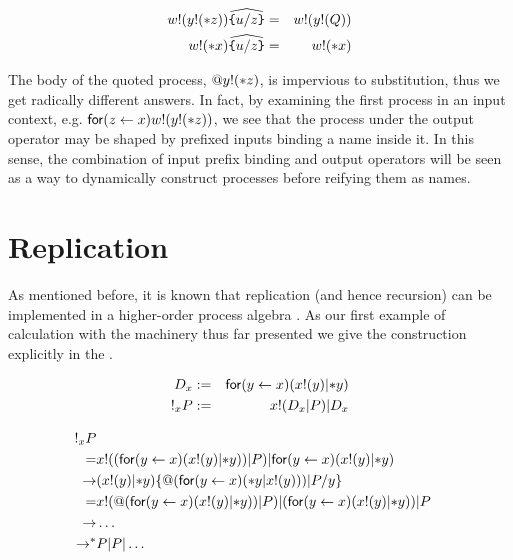 \begin{eqnarray}
	\lift{w}{\lift{y}{\dropn{z}}}\widehat{\id{\{}u / z \id{\}}}
		& = &
		\lift{w}{\lift{y}{Q}} \nonumber\\
	\lift{w}{\dropn{x}} \widehat{ \id{\{}u / z \id{\}} }
		& = &
		\lift{w}{\dropn{x}} \nonumber
\end{eqnarray}

The body of the quoted process, $\quotep{\lift{y}{\dropn{z}}}$, is
impervious to substitution, thus we get radically different
answers. In fact, by examining the first process in an input context,
e.g. $\mathsf{for}(z \leftarrow x)\lift{w}{\lift{y}{\dropn{z}}}$, we see that the process
under the output operator may be shaped by prefixed inputs binding a
name inside it. In this sense, the combination of input prefix binding
and output operators will be seen as a way to dynamically construct
processes before reifying them as names.

\section{Replication}

As mentioned before, it is known that replication (and hence
recursion) can be implemented in a higher-order process algebra
\cite{DBLP:books/daglib/0004377}. As our first example of calculation with the
machinery thus far presented we give the construction explicitly in
the {\rhoc}.

\begin{eqnarray}
	D_{x} & := & \prefix{x}{y}{(\binpar{\outputp{x}{y}}{\dropn{y}})} \nonumber\\
	\bangp_{x}{P} & := & \binpar{\lift{x}{\binpar{D_{x}}{P}}}{D_{x}} \nonumber
\end{eqnarray}

\begin{eqnarray}
	\bangp_{x}{P} & & \nonumber\\
	=
	& \lift{x}{(\prefix{x}{y}{(\outputp{x}{y} | \dropn{y})) | P}} 
	      | \prefix{x}{y}{(\outputp{x}{y} | \dropn{y})} & \nonumber\\
	\red
	& (\outputp{x}{y} | \dropn{y})\substn{\quotep{(\prefix{x}{y}{(\dropn{y} | \outputp{x}{y})) | P}}}{y} & \nonumber\\
	=
	& \outputp{x}{\quotep{(\prefix{x}{y}{(\outputp{x}{y} | \dropn{y})) | P}}}
	  | {(\prefix{x}{y}{(\outputp{x}{y} | \dropn{y})) | P}} & \nonumber\\
	\red
	& \ldots & \nonumber\\
	\red^*
	& P | P | \ldots & \nonumber
\end{eqnarray}

